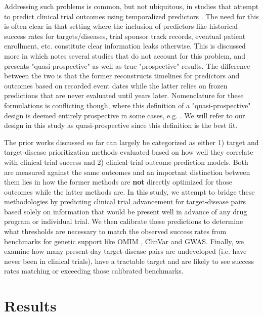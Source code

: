 \documentclass{article}
\begin{document}
Addressing such problems is common, but not ubiquitous, in studies that attempt to predict clinical trial outcomes using temporalized predictors \cite{PMID:37483175, PMID:34430930, Lo2019Machine}. The need for this is often clear in that setting where the inclusion of predictors like historical success rates for targets/diseases, trial sponsor track records, eventual patient enrollment, etc. constitute clear information leaks otherwise. This is discussed more in \cite{PMID:37483175} which notes several studies that do not account for this problem, and presents "quasi-prospective" as well as true "prospective" results. The difference between the two is that the former reconstructs timelines for predictors and outcomes based on recorded event dates while the latter relies on frozen predictions that are never evaluated until years later. Nomenclature for these formulations is conflicting though, where this definition of a "quasi-prospective" design is deemed entirely prospective in some cases, e.g. \cite{PMID:37225853}. We will refer to our design in this study as quasi-prospective since this definition is the best fit.

The prior works discussed so far can largely be categorized as either 1) target and target-disease prioritization methods evaluated based on how well they correlate with clinical trial success and 2) clinical trial outcome prediction models. Both are measured against the same outcomes and an important distinction between them lies in how the former methods are {\bf not} directly optimized for those outcomes while the latter methods are. In this study, we attempt to bridge these methodologies by predicting clinical trial advancement for target-disease pairs based solely on information that would be present well in advance of any drug program or individual trial. We then calibrate these predictions to determine what thresholds are necessary to match the observed success rates from benchmarks for genetic support like OMIM \cite{PMID:15608251}, ClinVar \cite{PMID:24234437} and GWAS. Finally, we examine how many present-day target-disease pairs are undeveloped (i.e. have never been in clinical trials), have a tractable target and are likely to see success rates matching or exceeding those calibrated benchmarks.

\section{Results}
\label{sec:results}
\end{document}
